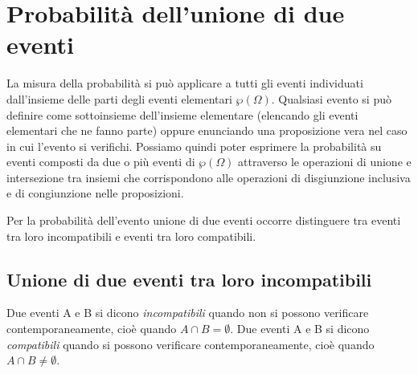 
\section{Probabilità dell'unione di due eventi}
\label{sec:09_unione}

La misura della probabilità si può applicare a tutti gli eventi individuati 
dall'insieme delle parti degli eventi elementari $\wp (\Omega )$. Qualsiasi 
evento si può definire come sottoinsieme dell'insieme elementare (elencando gli 
eventi elementari che ne fanno parte) oppure enunciando una proposizione vera 
nel caso in cui l'evento si verifichi. Possiamo quindi poter esprimere la 
probabilità su eventi composti da due o più eventi di $\wp (\Omega )$ attraverso 
le operazioni di unione e intersezione tra insiemi che corrispondono alle 
operazioni di disgiunzione inclusiva e di congiunzione nelle proposizioni.

Per la probabilità dell'evento unione di due eventi occorre distinguere tra 
eventi tra loro incompatibili e eventi tra loro compatibili.

\subsection[Unione di due eventi tra loro incompatibili]{Unione di due eventi 
tra loro incompatibili}

\begin{definizione}
Due eventi A e B si dicono \emph{incompatibili} quando non si possono verificare 
contemporaneamente, cioè quando $A\cap B=\emptyset $.
Due eventi A e B si dicono \emph{compatibili} quando si possono verificare 
contemporaneamente, cioè quando $A\cap B\neq \emptyset $.
\end{definizione}

